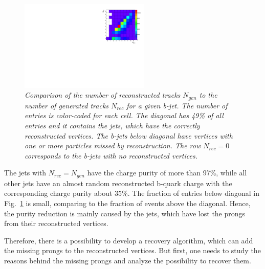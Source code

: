 \begin{figure}
{\centering
    \includegraphics[width=0.55\textwidth]{ILD/plots/rec-gen-table.pdf}
    \caption{\sl Comparison of the number of reconstructed tracks $N_{gen}$ to the number of generated tracks $N_{rec}$ for a given b-jet. The number of entries is color-coded for each cell. The diagonal has 49\% of all entries and it contains the jets, which have the correctly reconstructed vertices. The b-jets below diagonal have vertices with one or more particles missed by reconstruction. The row $N_{rec} = 0$ corresponds to the b-jets with no reconstructed vertices. %
    }
    \label{fig:Table_3}
  }
\end{figure}

The jets with $N_{rec}=N_{gen}$ have the charge purity of more than 97\%, while all other jets have an almost random reconstructed b-quark charge with the corresponding charge purity about 35\%.
The fraction of entries below diagonal in Fig.~\ref{fig:Table_3} is small, comparing to the fraction of events above the diagonal. 
Hence, the purity reduction is mainly caused by the jets, which have lost the prongs from their reconstructed vertices. 


Therefore, there is a possibility to develop a recovery algorithm, which can add the missing prongs to the reconstructed vertices.%
But first, one needs to study the reasons behind the missing prongs and analyze the possibility to recover them. 

